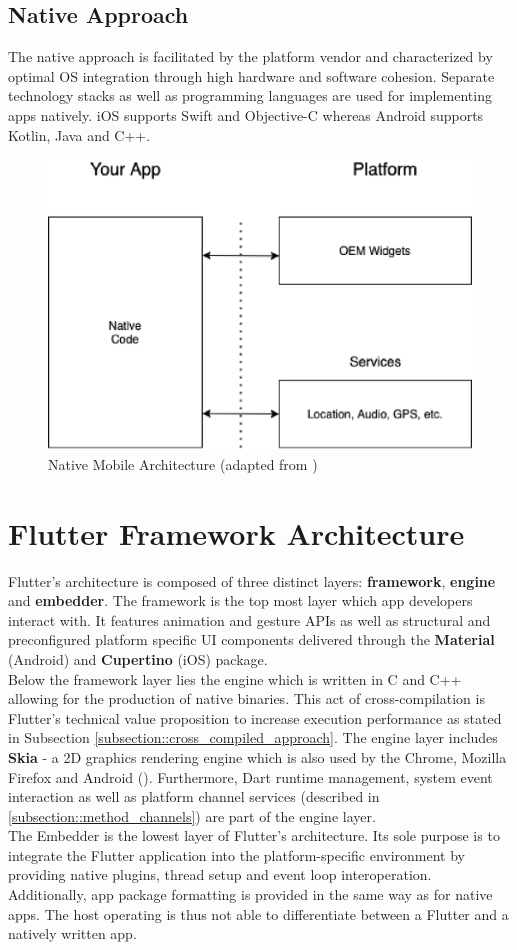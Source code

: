\subsection{Native Approach}
The native approach is facilitated by the platform vendor and characterized by optimal OS integration through high hardware and software cohesion.
Separate technology stacks as well as programming languages are used for implementing apps natively. 
iOS supports Swift and Objective-C whereas Android supports Kotlin, Java and C++.



\begin{figure}
    \centering
    \includegraphics[width=.7\linewidth]{images/architectures/native_architecture.eps}
    \caption{Native Mobile Architecture (adapted from \cite{Cunha2018})}
    \label{fig:native_architecture}
\end{figure}

\section{Flutter Framework Architecture} \label{section::flutter_architecture}
Flutter's architecture is composed of three distinct layers: \textbf{framework}, \textbf{engine} and \textbf{embedder}. 
The framework is the top most layer which app developers interact with. It features animation and gesture APIs as well as structural and preconfigured platform specific UI components delivered through
the \textbf{Material} (Android) and \textbf{Cupertino} (iOS) package.\\
Below the framework layer lies the engine which is written in C and C++ allowing for the production of native binaries. 
This act of cross-compilation is Flutter's technical value proposition to increase execution performance as stated in 
Subsection \ref{subsection::cross_compiled_approach}. The engine layer includes \textbf{Skia} - a 2D graphics rendering engine which is also used by the Chrome, Mozilla Firefox and Android (\cite{Skia2021}).
Furthermore, Dart runtime management, system event interaction as well as platform channel services (described in \ref{subsection::method_channels}) are part of the engine layer.\\
The Embedder is the lowest layer of Flutter's architecture. Its sole purpose is to integrate the Flutter application into the platform-specific environment
by providing native plugins, thread setup and event loop interoperation.
Additionally, app package formatting is provided in the same way as for native apps. 
The host operating is thus not able to differentiate between a Flutter and a natively written app.

